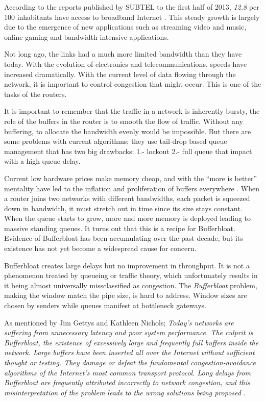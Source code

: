 According to the reports published by SUBTEL to the first half of 2013,
\textit{12.8} per 100 inhabitants have access to broadband
Internet \cite{OCDE}.  This steady growth is largely due to the emergence of
new applications such as streaming video and music, online gaming and
bandwidth intensive applications.

Not long ago, the links had a much more limited bandwidth than they have
today. With the evolution of electronics and telecommunications,
speeds have increased dramatically. With the current level of data flowing
through the network, it is important to control congestion that
might occur. This is one of the tasks of the routers.

It is important to remember that the traffic in a network is inherently
bursty, the role of the buffers in the router is to smooth the flow of
traffic. Without any buffering, to allocate the bandwidth evenly would be
impossible. But there are some problems with current algorithms; they use
tail-drop based queue management that has two big drawbacks: 1.- lockout 2.-
full queue that impact with a high queue delay.

Current low hardware prices make memory cheap,
and with the ``more is better'' mentality have led to the inflation and
proliferation of buffers everywhere \cite{NicholsJacobsonCQD}. When a router
joins two networks with different bandwidths, each packet is squeezed down in
bandwidth, it must stretch out in time since its size stays constant. When
the queue starts to grow, more and more memory is deployed leading to
massive standing queues. It turns out that this is a recipe for Bufferbloat.
Evidence of Bufferbloat has been accumulating over the past decade, but its
existence has not yet become a widespread cause for concern.

Bufferbloat creates large delays but no improvement in throughput. It is not a
phenomenon treated by queueing or traffic theory, which unfortunately results
in it being almost universally missclassified as congestion. The \textit{\gls{Bufferbloat}}
problem, making the window match the pipe size, is hard to address. Window
sizes are chosen by senders while queues manifest at bottleneck gateways.


As mentioned by Jim Gettys and Kathleen Nichols;
\textit{Today's networks are suffering from unnecessary latency and poor
system performance. The culprit is Bufferbloat, the existence of excessively
large and frequently full buffers inside the network. Large buffers have been
inserted all over the Internet without sufficient thought or testing. They
damage or defeat the fundamental congestion-avoidance algorithms of the
Internet's most common transport protocol. Long delays from Bufferbloat are
frequently attributed incorrectly to network congestion, and this
misinterpretation of the problem leads to the wrong solutions being
proposed} \cite{GettysNichols}.

